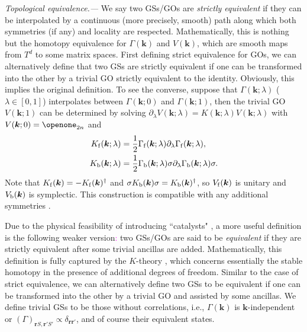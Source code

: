 \documentclass[prl,twocolumn,preprintnumbers,superscriptaddress,amsmath,amssymb]{revtex4-1}
\begin{document}
\emph{Topological equivalence.---} We say two GSs/GOs are \emph{strictly equivalent} if they can be interpolated by a continuous (more precisely, smooth) path along which both symmetries (if any) and locality are respected. Mathematically, this is nothing but the homotopy equivalence \cite{Whitehead1978} for $\Gamma (\boldsymbol{k})$ and $V (\boldsymbol{k})$, which are smooth maps from $T^d$ to some matrix spaces. First defining strict equivalence for GOs, we can alternatively define that two GSs are strictly equivalent if one can be transformed into the other by a trivial GO strictly equivalent to the identity. Obviously, this  implies the original definition. To see the converse, suppose that $\Gamma (\boldsymbol{k};\lambda)$ ($\lambda\in[0,1]$) interpolates between $\Gamma (\boldsymbol{k};0)$ and $\Gamma (\boldsymbol{k};1)$, then the trivial GO $V (\boldsymbol{k};1)$ can be determined by solving $\partial_\lambda V (\boldsymbol{k};\lambda)=K (\boldsymbol{k};\lambda)V (\boldsymbol{k};\lambda)$ with $V (\boldsymbol{k};0)=\openone_{2n}$ and
\begin{equation}
\begin{split}
K_{\rm f}(\boldsymbol{k};\lambda)&=  \frac{1}{2}\Gamma_{\rm f}(\boldsymbol{k};\lambda)\partial_\lambda\Gamma_{\rm f}(\boldsymbol{k};\lambda),\\
K_{\rm b}(\boldsymbol{k};\lambda)&=  \frac{1}{2}\Gamma_{\rm b}(\boldsymbol{k};\lambda)\sigma\partial_\lambda\Gamma_{\rm b}(\boldsymbol{k};\lambda)\sigma.
\end{split}
\label{Kfb}
\end{equation}
Note that $K_{\rm f}(\boldsymbol{k})=-K_{\rm f}(\boldsymbol{k})^\dag$ and $\sigma K_{\rm b}(\boldsymbol{k})\sigma=K_{\rm b}(\boldsymbol{k})^\dag$, so $V_{\rm f}(\boldsymbol{k})$ is unitary and $V_{\rm b}(\boldsymbol{k})$ is symplectic. This construction is compatible with any additional symmetries \cite{SM}.

Due to %
the physical feasibility of introducing ``catalysts" \cite{Anshu2018}, a more useful definition is %
the following weaker version\textcolor{magenta}{:} %
two GSs/GOs are said to be \emph{equivalent} if they are strictly equivalent after some trivial ancillas are added. Mathematically, this definition is fully captured by the $K$-theory \cite{Karoubi2008}, which concerns essentially the stable homotopy in the presence of additional degrees of freedom. Similar to the case of strict equivalence, we can alternatively define two GSs to be equivalent if one can be transformed into the other by a trivial \cite{tri} GO and assisted by some ancillas. We define trivial GSs to be those without correlations, i.e., $\Gamma (\boldsymbol{k})$ is $\boldsymbol{k}$-independent or $(\Gamma)_{\boldsymbol{r}S,\boldsymbol{r}'S'}\propto \delta_{\boldsymbol{r}\boldsymbol{r}'}$, and of course their equivalent states.
\end{document}
